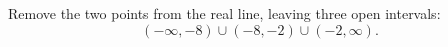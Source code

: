Remove the two points from the real line, leaving three open intervals:
\[
\boxed{(-\infty,-8)\cup(-8,-2)\cup(-2,\infty)}.
\]
